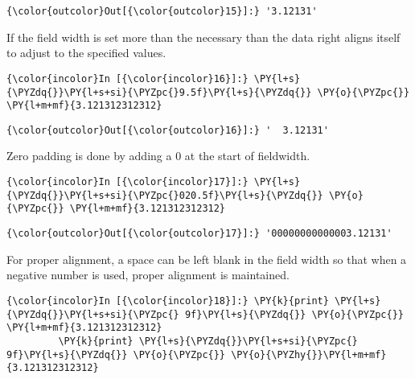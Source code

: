             \begin{Verbatim}[commandchars=\\\{\}]
{\color{outcolor}Out[{\color{outcolor}15}]:} '3.12131'
\end{Verbatim}
        
    If the field width is set more than the necessary than the data right
aligns itself to adjust to the specified values.

    \begin{Verbatim}[commandchars=\\\{\}]
{\color{incolor}In [{\color{incolor}16}]:} \PY{l+s}{\PYZdq{}}\PY{l+s+si}{\PYZpc{}9.5f}\PY{l+s}{\PYZdq{}} \PY{o}{\PYZpc{}} \PY{l+m+mf}{3.121312312312}
\end{Verbatim}

            \begin{Verbatim}[commandchars=\\\{\}]
{\color{outcolor}Out[{\color{outcolor}16}]:} '  3.12131'
\end{Verbatim}
        
    Zero padding is done by adding a 0 at the start of fieldwidth.

    \begin{Verbatim}[commandchars=\\\{\}]
{\color{incolor}In [{\color{incolor}17}]:} \PY{l+s}{\PYZdq{}}\PY{l+s+si}{\PYZpc{}020.5f}\PY{l+s}{\PYZdq{}} \PY{o}{\PYZpc{}} \PY{l+m+mf}{3.121312312312}
\end{Verbatim}

            \begin{Verbatim}[commandchars=\\\{\}]
{\color{outcolor}Out[{\color{outcolor}17}]:} '00000000000003.12131'
\end{Verbatim}
        
    For proper alignment, a space can be left blank in the field width so
that when a negative number is used, proper alignment is maintained.

    \begin{Verbatim}[commandchars=\\\{\}]
{\color{incolor}In [{\color{incolor}18}]:} \PY{k}{print} \PY{l+s}{\PYZdq{}}\PY{l+s+si}{\PYZpc{} 9f}\PY{l+s}{\PYZdq{}} \PY{o}{\PYZpc{}} \PY{l+m+mf}{3.121312312312}
         \PY{k}{print} \PY{l+s}{\PYZdq{}}\PY{l+s+si}{\PYZpc{} 9f}\PY{l+s}{\PYZdq{}} \PY{o}{\PYZpc{}} \PY{o}{\PYZhy{}}\PY{l+m+mf}{3.121312312312}
\end{Verbatim}

